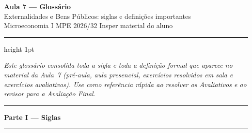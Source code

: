 \documentclass[11pt]{article}
\newcommand{\secao}[1]{%
  \bigskip
  {\color{insperred}\rule{\textwidth}{1.2pt}}\par
  \nopagebreak
  {\Large\bfseries\color{insperred} #1}\par
  \nopagebreak
  {\color{insperred}\rule{\textwidth}{0.4pt}}\par
  \smallskip}
\begin{document}
\begin{center}
  {\LARGE\bfseries\color{insperred} Aula 7 --- Glossário}\\[2pt]
  {\large Externalidades e Bens Públicos: siglas e definições importantes}\\[4pt]
  {\normalsize Microeconomia I \textbullet{} MPE 2026/32 \textbullet{} Insper \textbullet{} material do aluno}
\end{center}
\vspace{2pt}
{\color{insperred!40}\hrule height 1pt}
\vspace{4pt}

\noindent\textit{Este glossário consolida toda a sigla e toda a definição formal que aparece no material da
Aula~7 (pré-aula, aula presencial, exercícios resolvidos em sala e exercícios avaliativos). Use como
referência rápida ao resolver os Avaliativos e ao revisar para a Avaliação Final.}

\secao{Parte I --- Siglas}
\end{document}
